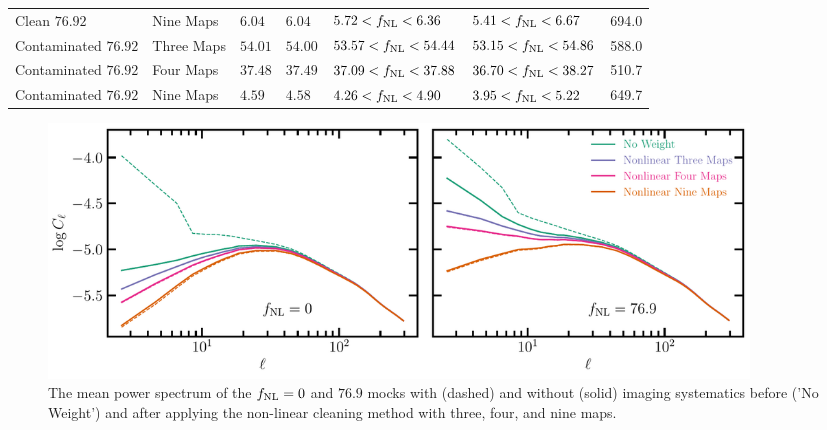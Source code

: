 \begin{table}
{\begin{tabular}{lllllll}
Clean $76.92$ & Nine Maps               & $  6.04$& $  6.04$& $  5.72<f_{\rm NL}<  6.36$& $  5.41<f_{\rm NL}<  6.67$ &  694.0\\
Contaminated $76.92$ & Three Maps       & $ 54.01$& $ 54.00$& $ 53.57<f_{\rm NL}< 54.44$& $ 53.15<f_{\rm NL}< 54.86$ &  588.0\\
Contaminated $76.92$ & Four Maps        & $ 37.48$& $ 37.49$& $ 37.09<f_{\rm NL}< 37.88$& $ 36.70<f_{\rm NL}< 38.27$ &  510.7\\
Contaminated $76.92$ & Nine Maps        & $  4.59$& $  4.58$& $  4.26<f_{\rm NL}<  4.90$& $  3.95<f_{\rm NL}<  5.22$ &  649.7\\
\hline
    \end{tabular}
    }
\end{table}

\begin{figure}
    \centering
    \includegraphics[width=0.9\textwidth]{figures/clmocks.pdf}
    \caption{The mean power spectrum of the $f_{\rm NL} =0$ and $76.9$ mocks with (dashed) and without (solid) imaging systematics before ('No Weight') and after applying the non-linear cleaning method with three, four, and nine maps.}\label{fig:clmocks}
\end{figure}

